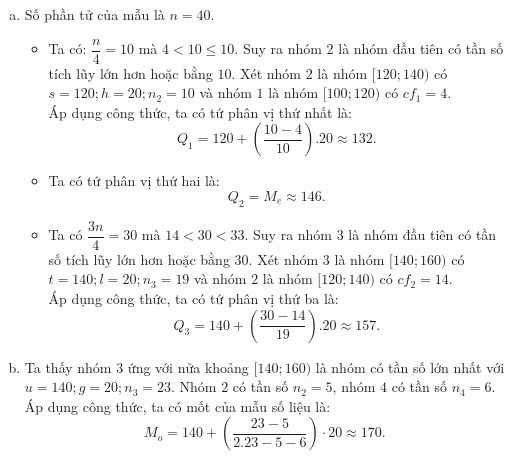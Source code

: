 \begin{bt}
{\begin{enumerate} [a)]
			$$\dfrac{n}{2}=\dfrac{40}{2}=20$$
			mà $cf_2=14<20<cf_3=33$. Suy ra nhóm $3$ là nhóm đầu tiên có tần số tích lũy lớn hơn hoặc bằng $20$.\\
			Xét nhóm $3$ là nhóm $[140;160)$ có $r=140;d=20;n_3=19$ và nhóm $2$ là nhóm $[140;160)$ có $cf_2=14$.\\
			Áp dụng công thức, ta có trung vị của mẫu số liệu là:
			$$M_e=140+\left(\dfrac{20-14}{19}\right).20 \approx 146$$
			\item Số phần tử của mẫu là $n=40$.
			\begin{itemize} 
				\item Ta có: $\dfrac{n}{4}=10$ mà $4<10 \le 10$. Suy ra nhóm $2$ là nhóm đầu tiên có tần số tích lũy lớn hơn hoặc bằng $10$. Xét nhóm $2$ là nhóm $[120;140)$ có $s=120;h=20;n_2=10$ và nhóm $1$ là nhóm $[100;120)$ có $cf_1=4$.\\
				Áp dụng công thức, ta có tứ phân vị thứ nhất là:
				$$Q_1=120+\left(\dfrac{10-4}{10}\right).20 \approx 132.$$
				\item Ta có tứ phân vị thứ hai là: 
				$$Q_2=M_e \approx 146.$$
				\item Ta có $\dfrac{3n}{4}=30$ mà $14<30<33$. Suy ra nhóm $3$ là nhóm đầu tiên có tần số tích lũy lớn hơn hoặc bằng $30$. Xét nhóm $3$ là nhóm $[140;160)$ có $t=140;l=20;n_3=19$ và nhóm $2$ là nhóm $[120;140)$ có $cf_2=14$.\\
				Áp dụng công thức, ta có tứ phân vị thứ ba là:
				$$Q_3=140+\left(\dfrac{30-14}{19}\right).20 \approx 157.$$	
			\end{itemize}
			\item Ta thấy nhóm $3$ ứng với nửa khoảng $[140;160)$ là nhóm có tần số lớn nhất với $u=140;g=20;n_3=23$. Nhóm $2$ có tần số $n_2=5$, nhóm $4$ có tần số $n_4=6$.\\
			Áp dụng công thức, ta có mốt của mẫu số liệu là:
			$$ M_o=140+\left(\dfrac{23-5}{2.23-5-6}\right) \cdot 20 \approx 170.$$
		\end{enumerate}
	}
\end{bt}

